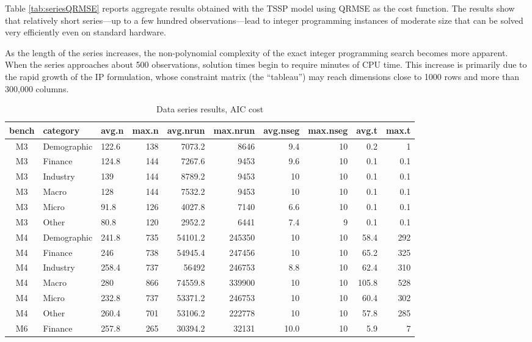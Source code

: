 \documentclass[preprints,article,submit,pdftex,moreauthors]{Definitions/mdpi}
\begin{document}
Table \ref{tab:seriesQRMSE} reports aggregate results obtained with the TSSP model using QRMSE as the cost function. The results show that relatively short series—up to a few hundred observations—lead to integer programming instances of moderate size that can be solved very efficiently even on standard hardware.

As the length of the series increases, the non-polynomial complexity of the exact integer programming search becomes more apparent. When the series approaches about 500 observations, solution times begin to require minutes of CPU time. This increase is primarily due to the rapid growth of the IP formulation, whose constraint matrix (the “tableau”) may reach dimensions close to 1000 rows and more than 300,000 columns.

\begin{table}[ht]
	\centering
	\caption{Data series results, AIC cost}\label{tab:seriesAIC}%
\begin{tabular}{@{}cl|lr|rr|rr|rr}
	\toprule
		bench & category & avg.n & max.n & avg.nrun & max.nrun & avg.nseg & max.nseg & avg.t & max.t \\
		\midrule
		M3 & Demographic & 122.6 & 138 & 7073.2 & 8646 & 9.4 & 10 & 0.2 & 1 \\
		M3 & Finance     & 124.8 & 144 & 7267.6 & 9453 & 9.6 & 10 & 0.1 & 0.1 \\
		M3 & Industry    & 139 	 & 144 & 8789.2 & 9453 & 10 & 10  & 0.1 & 0.1 \\
		M3 & Macro       & 128   & 144 & 7532.2 & 9453 & 10 & 10  & 0.1 & 0.1 \\
		M3 & Micro       & 91.8  & 126 & 4027.8 & 7140 & 6.6 & 10 & 0.1 & 0.1 \\
		M3 & Other       & 80.8  & 120 & 2952.2 & 6441 & 7.4 & 9  & 0.1 & 0.1 \\
		M4 & Demographic & 241.8 & 735 & 54101.2 & 245350 & 10  & 10 & 58.4 & 292 \\
		M4 & Finance 	 & 246   & 738 & 54945.4 & 247456 & 10  & 10 & 65.2 & 325 \\
		M4 & Industry 	 & 258.4 & 737 & 56492   & 246753 & 8.8 & 10 & 62.4 & 310 \\
		M4 & Macro 		 & 280   & 866 & 74559.8 & 339900 & 10  & 10 & 105.8 & 528 \\
		M4 & Micro 		 & 232.8 & 737 & 53371.2 & 246753 & 10  & 10 & 60.4 & 302 \\
		M4 & Other 		 & 260.4 & 701 & 53106.2 & 222778 & 10  & 10 & 57.8 & 285 \\
		M6 & Finance 	 & 257.8 & 265 & 30394.2 & 32131 & 10.0 & 10 & 5.9 & 7 \\
		\bottomrule
	\end{tabular}
\end{table}
\end{document}
